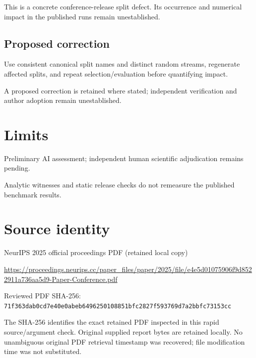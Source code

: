 \documentclass[11pt]{article}
\begin{document}
This is a concrete conference-release split defect. Its occurrence and numerical impact in the published runs remain unestablished.

\subsection*{Proposed correction}

Use consistent canonical split names and distinct random streams, regenerate affected splits, and repeat selection/evaluation before quantifying impact.

A proposed correction is retained where stated; independent verification and author adoption remain unestablished.

\section*{Limits}

Preliminary AI assessment; independent human scientific adjudication remains pending.\par

Analytic witnesses and static release checks do not remeasure the published benchmark results.\par

\section*{Source identity}

NeurIPS 2025 official proceedings PDF (retained local copy)

\url{https://proceedings.neurips.cc/paper_files/paper/2025/file/e4e5d01075906f9d8522911a736aa5d9-Paper-Conference.pdf}

Reviewed PDF SHA-256: \nolinkurl{71f363dab0cd7e40e0abeb6496250108851bfc2827f593769d7a2bbfc73153cc}

The SHA-256 identifies the exact retained PDF inspected in this rapid source/argument check. Original supplied report bytes are retained locally. No unambiguous original PDF retrieval timestamp was recovered; file modification time was not substituted.
\end{document}
